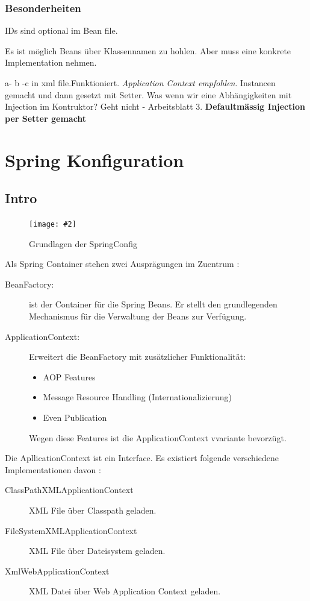 \documentclass[a4paper,10pt]{scrreprt}
\newcommand{\pic}[2][figure]{\begin{figure}[h]
 \centering
 \texttt{[image: \#2]}
 \caption{#1}
\end{figure}
}
\begin{document}
\subsection{Besonderheiten}
 \begin{description}

  \item IDs sind optional im Bean file.
  \item Es ist möglich Beans über Klassennamen zu hohlen. Aber muss eine konkrete Implementation nehmen.
  \item [Circular References] a- b -c in xml file.Funktioniert. \textit{Application Context empfohlen}. Instancen gemacht und dann gesetzt mit Setter.
  Was wenn wir eine Abhängigkeiten mit Injection im Kontruktor? Geht nicht - Arbeitsblatt 3. \textbf{Defaultmässig Injection per Setter gemacht}
 \end{description}
 
\chapter{Spring Konfiguration}

\section{Intro}
\pic[Grundlagen der SpringConfig]{spconfig.png}

Als Spring Container stehen zwei Ausprägungen im Zuentrum :
\begin{description}
 \item [BeanFactory:] ist der Container für die Spring Beans. Er stellt den grundlegenden Mechanismus für die Verwaltung der Beans zur Verfügung.
 \item [ApplicationContext:] Erweitert die BeanFactory mit zusätzlicher Funktionalität:
 \begin{itemize}
  \item AOP Features
  \item Message Resource Handling (Internationalizierung)
  \item Even Publication
 \end{itemize}
Wegen diese Features ist die ApplicationContext vvariante bevorzügt.
\end{description}

Die ApllicationContext ist ein Interface. Es existiert folgende verschiedene Implementationen davon :
\begin{description}
 \item [ClassPathXMLApplicationContext] XML File über Classpath geladen.
 \item [FileSystemXMLApplicationContext] XML File über Dateisystem geladen.
 \item [XmlWebApplicationContext] XML Datei über Web Application Context geladen.
\end{description}
\end{document}
